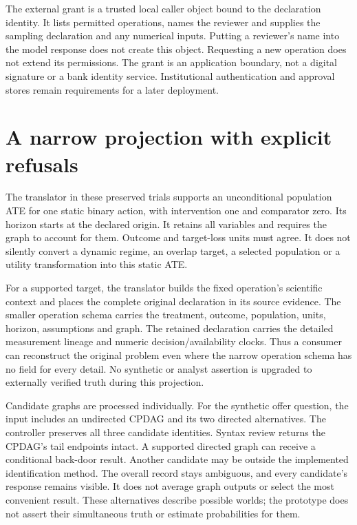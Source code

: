 The external grant is a trusted local caller object bound to the declaration
identity. It lists permitted operations, names the reviewer and supplies the
sampling declaration and any numerical inputs. Putting a reviewer's name into
the model response does not create this object. Requesting a new operation does
not extend its permissions. The grant is an application boundary, not a digital
signature or a bank identity service. Institutional authentication and approval
stores remain requirements for a later deployment.

\section{A narrow projection with explicit refusals}

The translator in these preserved trials supports an unconditional population ATE for one
static binary action, with intervention one and comparator zero. Its horizon
starts at the declared origin. It retains all variables and requires the graph
to account for them. Outcome and target-loss units must agree. It does not
silently convert a dynamic regime, an overlap target, a selected population or
a utility transformation into this static ATE.

For a supported target, the translator builds the fixed operation's scientific
context and places the complete original declaration in its source evidence.
The smaller operation schema carries the treatment, outcome, population, units,
horizon, assumptions and graph. The retained declaration carries the detailed
measurement lineage and numeric decision/availability clocks. Thus a consumer
can reconstruct the original problem even where the narrow operation schema
has no field for every detail. No synthetic or analyst assertion is upgraded to
externally verified truth during this projection.

Candidate graphs are processed individually. For the synthetic offer question,
the input includes an undirected CPDAG and its two directed alternatives. The
controller preserves all three candidate identities. Syntax review returns the
CPDAG's tail endpoints intact. A supported directed graph can receive a
conditional back-door result. Another candidate may be outside the implemented
identification method. The overall record stays ambiguous, and every candidate's
response remains visible. It does not average graph outputs or select the most
convenient result. These alternatives describe possible worlds; the prototype
does not assert their simultaneous truth or estimate probabilities for them.

